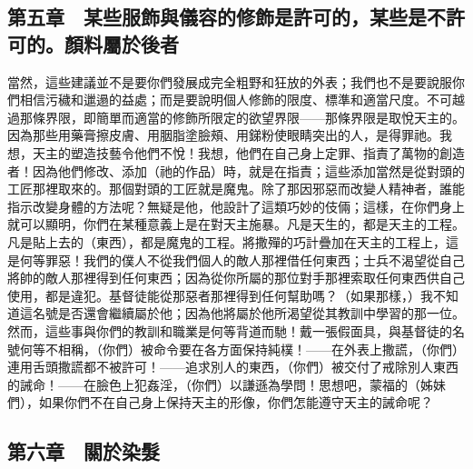 
\subsection{第五章　某些服飾與儀容的修飾是許可的，某些是不許可的。顏料屬於後者}

當然，這些建議並不是要你們發展成完全粗野和狂放的外表；我們也不是要說服你們相信污穢和邋遢的益處；而是要說明個人修飾的限度、標準和適當尺度。不可越過那條界限，即簡單而適當的修飾所限定的欲望界限——那條界限是取悅天主的。因為那些用藥膏擦皮膚、用胭脂塗臉頰、用銻粉使眼睛突出的人，是得罪祂。我想，天主的塑造技藝令他們不悅！我想，他們在自己身上定罪、指責了萬物的創造者！因為他們修改、添加（祂的作品）時，就是在指責；這些添加當然是從對頭的工匠那裡取來的。那個對頭的工匠就是魔鬼。除了那因邪惡而改變人精神者，誰能指示改變身體的方法呢？無疑是他，他設計了這類巧妙的伎倆；這樣，在你們身上就可以顯明，你們在某種意義上是在對天主施暴。凡是天生的，都是天主的工程。凡是貼上去的（東西），都是魔鬼的工程。將撒殫的巧計疊加在天主的工程上，這是何等罪惡！我們的僕人不從我們個人的敵人那裡借任何東西；士兵不渴望從自己將帥的敵人那裡得到任何東西；因為從你所屬的那位對手那裡索取任何東西供自己使用，都是違犯。基督徒能從那惡者那裡得到任何幫助嗎？（如果那樣，）我不知道這名號是否還會繼續屬於他；因為他將屬於他所渴望從其教訓中學習的那一位。然而，這些事與你們的教訓和職業是何等背道而馳！戴一張假面具，與基督徒的名號何等不相稱，（你們）被命令要在各方面保持純樸！——在外表上撒謊，（你們）連用舌頭撒謊都不被許可！——追求別人的東西，（你們）被交付了戒除別人東西的誡命！——在臉色上犯姦淫，（你們）以謙遜為學問！思想吧，蒙福的（姊妹們），如果你們不在自己身上保持天主的形像，你們怎能遵守天主的誡命呢？\par


\subsection{第六章　關於染髮}

